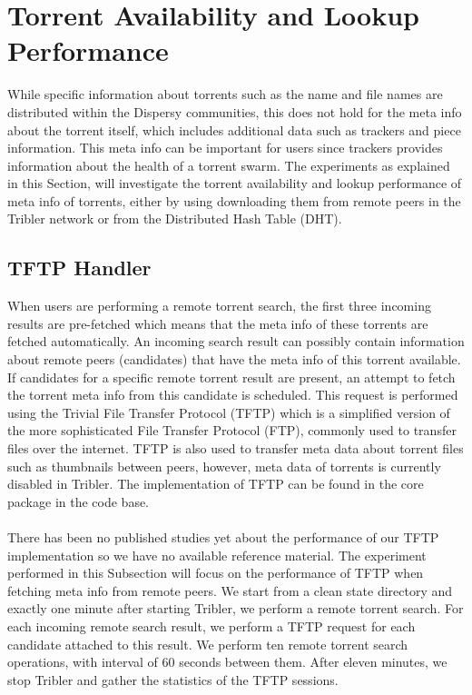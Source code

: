 \section{Torrent Availability and Lookup Performance}
While specific information about torrents such as the name and file names are distributed within the Dispersy communities, this does not hold for the meta info about the torrent itself, which includes additional data such as trackers and piece information. This meta info can be important for users since trackers provides information about the health of a torrent swarm. The experiments as explained in this Section, will investigate the torrent availability and lookup performance of meta info of torrents, either by using downloading them from remote peers in the Tribler network or from the Distributed Hash Table (DHT).

\subsection{TFTP Handler}
When users are performing a remote torrent search, the first three incoming results are pre-fetched which means that the meta info of these torrents are fetched automatically. An incoming search result can possibly contain information about remote peers (candidates) that have the meta info of this torrent available. If candidates for a specific remote torrent result are present, an attempt to fetch the torrent meta info from this candidate is scheduled. This request is performed using the Trivial File Transfer Protocol (TFTP)\cite{sollins1992tftp} which is a simplified version of the more sophisticated File Transfer Protocol (FTP), commonly used to transfer files over the internet. TFTP is also used to transfer meta data about torrent files such as thumbnails between peers, however, meta data of torrents is currently disabled in Tribler. The implementation of TFTP can be found in the core package in the code base.\\\\
There has been no published studies yet about the performance of our TFTP implementation so we have no available reference material. The experiment performed in this Subsection will focus on the performance of TFTP when fetching meta info from remote peers. We start from a clean state directory and exactly one minute after starting Tribler, we perform a remote torrent search. For each incoming remote search result, we perform a TFTP request for each candidate attached to this result. We perform ten remote torrent search operations, with interval of 60 seconds between them. After eleven minutes, we stop Tribler and gather the statistics of the TFTP sessions.\\

